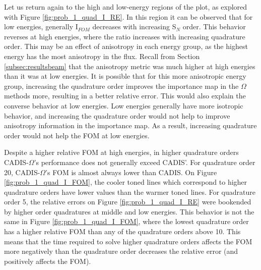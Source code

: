 Let us return again to the high and low-energy regions of the plot, as explored
with Figure \ref{fig:prob_1_quad_I_RE}. In this region it can be observed
that for low energies, generally I$_{FOM}$ decreases with increasing
S$_{N}$ order. This behavior reverses at high energies, where the ratio
increases with increasing quadrature order. This may be an effect of anisotropy
in each energy group, as the highest energy has the most anisotropy in the flux.
Recall from Section \ref{subsec:resultsbeam} that the anisotropy metric was much
higher at high energies than it was at low energies. It is possible that for
this more anisotropic energy group, increasing the quadrature order improves the
importance map in the $\Omega$ methods more, resulting in a better relative
error. This would also explain the converse behavior at low energies. Low
energies generally have more isotropic behavior, and increasing the quadrature
order would not help to improve anisotropy information in the importance map.
As a result, increasing quadrature order would not help the FOM at low energies.

Despite a higher relative FOM at high energies, in higher quadrature orders
CADIS-$\Omega$'s performance does not generally exceed CADIS'. For quadrature
order 20, CADIS-$\Omega$'s FOM is almost always lower than CADIS. On Figure
\ref{fig:prob_1_quad_I_FOM}, the cooler toned lines which correspond to higher
quadrature orders have lower values than the warmer toned lines.
For quadrature order 5,
the relative errors on Figure \ref{fig:prob_1_quad_I_RE} were bookended by
higher order quadratures at middle and low energies. This behavior is not the
same in Figure \ref{fig:prob_1_quad_I_FOM}, where the lowest quadrature order
has a higher relative FOM than any of the quadrature orders above 10. This means
that the time required to solve higher quadrature orders affects the FOM more
negatively than the quadrature order decreases the relative error (and
positively affects the FOM).

%
%
%
%
%
%
%

